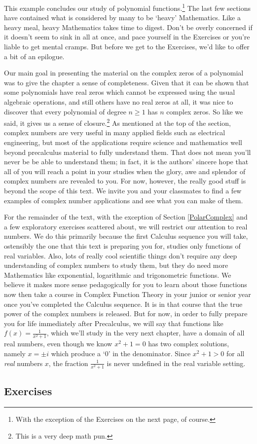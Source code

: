 This example concludes our study of polynomial functions.\footnote{With the exception of the Exercises on the next page, of course.}  The last few sections have contained what is considered by many to be `heavy' Mathematics.  Like a heavy meal, heavy Mathematics takes time to digest.  Don't be overly concerned if it doesn't seem to sink in all at once, and pace yourself in the Exercises or you're liable to get mental cramps.  But before we get to the Exercises, we'd like to offer a bit of an epilogue.  

\label{complexepilogue}

Our main goal in presenting the material on the complex zeros of a polynomial was to give the chapter a sense of completeness.  Given that it can be shown that some polynomials have real zeros which cannot be expressed using the usual algebraic operations, and still others have no real zeros at all, it was nice to discover that every polynomial of degree $n \geq 1$ has $n$ complex zeros.  So like we said, it gives us a sense of closure.\footnote{This is a very deep math pun.}  As mentioned at the top of the section, complex numbers are very useful in many applied fields such as electrical engineering,  but most of the applications require science and mathematics well beyond precalculus material to fully understand them.  That does not mean you'll never be be able to understand them; in fact, it is the authors' sincere hope that all of you will reach a point in your studies when the glory, awe and splendor of complex numbers are revealed to you.  For now, however, the really good stuff is beyond the scope of this text. We invite you and your classmates to find a few examples of complex number applications and see what you can make of them. 

For the remainder of the text, with the exception of Section \ref{PolarComplex} and a few exploratory exercises scattered about, we will restrict our attention to real numbers.  We do this primarily because the first Calculus sequence you will take, ostensibly the one that this text is preparing you for, studies only functions of real variables.  Also, lots of really cool scientific things don't require any deep understanding of complex numbers to study them, but they do need more Mathematics like exponential, logarithmic and trigonometric functions.  We believe it makes more sense pedagogically for you to learn about those functions now then take a course in Complex Function Theory in your junior or senior year once you've completed the Calculus sequence.  It is in that course that the true power of the complex numbers is released.  But for now, in order to fully prepare you for life immediately after Precalculus, we will say that functions like $f(x) = \frac{1}{x^{2} + 1}$, which we'll study in the very next chapter,  have a domain of all real numbers, even though we know $x^{2} + 1 = 0$ has two complex solutions, namely $x = \pm i$ which produce a `$0$' in the denominator.  Since $x^{2} + 1 > 0$ for all \textit{real} numbers $x$, the fraction $\frac{1}{x^{2} + 1}$ is never undefined in the real variable setting.

\clearpage

\subsection{Exercises}



\closegraphsfile